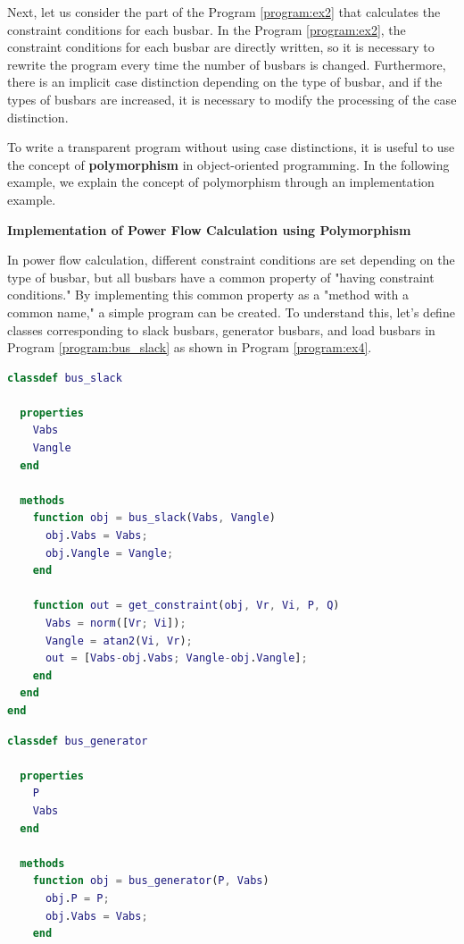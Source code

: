 \documentclass[graybox, envcountchap]{svmult}
\begin{document}
Next, let us consider the part of the Program \ref{program:ex2} that calculates
the constraint conditions for each busbar. In the Program \ref{program:ex2}, the
constraint conditions for each busbar are directly written, so it is necessary
to rewrite the program every time the number of busbars is changed. Furthermore,
there is an implicit case distinction depending on the type of busbar, and if
the types of busbars are increased, it is necessary to modify the processing of
the case distinction.

To write a transparent program without using case distinctions, it is useful to
use the concept of \textbf{polymorphism} in object-oriented programming. In the
following example, we explain the concept of polymorphism through an
implementation example.

\begin{example}{\textbf{Implementation of Power Flow Calculation using Polymorphism}}

In power flow calculation, different constraint conditions are set depending on
the type of busbar, but all busbars have a common property of "having constraint
conditions." By implementing this common property as a "method with a common
name," a simple program can be created. To understand this, let's define
classes corresponding to slack busbars, generator busbars, and load busbars in
Program \ref{program:bus_slack} as shown in Program \ref{program:ex4}.

\begin{lstlisting}[language=Matlab, caption=bus\_slack.m, label={program:bus_slack}]
classdef bus_slack
  
  properties
    Vabs
    Vangle
  end
  
  methods
    function obj = bus_slack(Vabs, Vangle)
      obj.Vabs = Vabs;
      obj.Vangle = Vangle;
    end
    
    function out = get_constraint(obj, Vr, Vi, P, Q)
      Vabs = norm([Vr; Vi]);
      Vangle = atan2(Vi, Vr);
      out = [Vabs-obj.Vabs; Vangle-obj.Vangle];
    end
  end
end
\end{lstlisting}


\begin{lstlisting}[language=Matlab, caption=bus\_generator.m, label={program:bus_PV}]
classdef bus_generator
  
  properties
    P
    Vabs
  end
  
  methods
    function obj = bus_generator(P, Vabs)
      obj.P = P;
      obj.Vabs = Vabs;
    end
    

\end{lstlisting}
\end{example}
\end{document}
